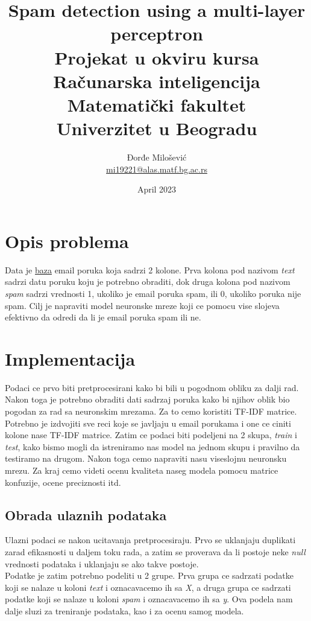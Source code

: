 \documentclass{article}
\title{%
  Spam detection using a multi-layer perceptron \vspace{0.4cm} \\ 
  \large Projekat u okviru kursa Računarska inteligencija \\
  Matematički fakultet\\ Univerzitet u Beogradu \vspace*{0.5cm}}
\author{Đorđe Milošević \\
\href{mailto:mi17105@alas.matf.bg.ac.rs}{mi19221@alas.matf.bg.ac.rs} \\
}
\date{\vspace*{1cm}April 2023}
\begin{document}
\maketitle

\newpage

\renewcommand*\contentsname{Sadržaj}
\tableofcontents
\newpage

\section{Opis problema}
Data je \href{https://github.com/Djolka/Spam-detection-using-a-multi-layer-perceptron/blob/main/emails.csv}{baza} email poruka koja sadrzi 2 kolone. Prva kolona pod nazivom \textit{text} sadrzi datu poruku koju je potrebno obraditi, dok druga kolona pod nazivom \textit{spam} sadrzi vrednosti 1, ukoliko je email poruka spam, ili 0, ukoliko poruka nije spam.
Cilj je napraviti model neuronske mreze koji ce pomocu vise slojeva efektivno da odredi da li je email poruka spam ili ne.

\section{Implementacija}
Podaci ce prvo biti pretprocesirani kako bi bili u pogodnom obliku za dalji rad. Nakon toga je potrebno obraditi dati sadrzaj poruka kako bi njihov oblik bio pogodan za rad sa neuronskim mrezama. Za to cemo koristiti TF-IDF matrice. Potrebno je izdvojiti sve reci koje se javljaju u email porukama i one ce ciniti kolone nase TF-IDF matrice. Zatim ce podaci biti podeljeni na 2 skupa, \textit{train} i \textit{test}, kako bismo mogli da istreniramo nas model na jednom skupu i pravilno da testiramo na drugom. Nakon toga cemo napraviti nasu viseslojnu neuronsku mrezu. Za kraj cemo videti ocenu kvaliteta naseg modela pomocu matrice konfuzije, ocene preciznosti itd.  

\subsection{Obrada ulaznih podataka}
Ulazni podaci se nakon ucitavanja pretprocesiraju. Prvo se uklanjaju duplikati zarad efikasnosti u daljem toku rada, a zatim se proverava da li postoje neke \textit{null} vrednosti podataka i uklanjaju se ako takve postoje.\\
Podatke je zatim potrebno podeliti u 2 grupe. Prva grupa ce sadrzati podatke koji se nalaze u koloni \textit{text} i oznacavacemo ih sa \textit{X}, a druga grupa ce sadrzati podatke koji se nalaze u koloni \textit{spam} i oznacavacemo ih sa \textit{y}. Ova podela nam dalje sluzi za treniranje podataka, kao i za ocenu samog modela.\\
\end{document}
